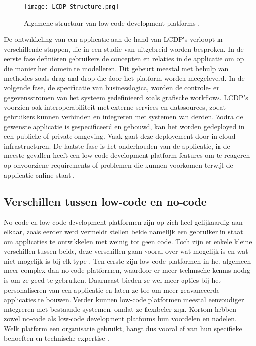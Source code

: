 \begin{figure}[h]
    \centering
    \texttt{[image: LCDP\_Structure.png]}
    \caption[Structuur low-code platforms]{Algemene structuur van low-code development platforms \autocite{Sahay2020}.}
    \label{fig:lcdp_structure}
\end{figure}

De ontwikkeling van een applicatie aan de hand van LCDP's verloopt in verschillende stappen, die in een studie van \textcite{Ruscio2022} uitgebreid worden besproken. In de eerste fase definiëren gebruikers de concepten en relaties in de applicatie om op die manier het domein te modelleren. Dit gebeurt meestal met behulp van methodes zoals drag-and-drop die door het platform worden meegeleverd. In de volgende fase, de specificatie van businesslogica, worden de controle- en gegevensstromen van het systeem gedefinieerd zoals grafische workflows. LCDP's voorzien ook interoperabiliteit met externe services en datasources, zodat gebruikers kunnen verbinden en integreren met systemen van derden. Zodra de gewenste applicatie is gespecificeerd en gebouwd, kan het worden gedeployed in een publieke of private omgeving. Vaak gaat deze deployement door in cloud-infrastructuren. De laatste fase is het onderhouden van de applicatie, in de meeste gevallen heeft een low-code development platform features om te reageren op onvoorziene requirements of problemen die kunnen voorkomen terwijl de applicatie online staat . \\

\subsection{Verschillen tussen low-code en no-code}
\label{subsec:verschillen_low_code}

No-code en low-code development platformen zijn op zich heel gelijkaardig aan elkaar, zoals eerder werd vermeldt stellen beide namelijk een gebruiker in staat om applicaties te ontwikkelen met weinig tot geen code. Toch zijn er enkele kleine verschillen tussen beide, deze verschillen gaan vooral over wat mogelijk is en wat niet mogelijk is bij elk type \autocite{Yan2021}. Ten eerste zijn low-code platformen in het algemeen meer complex dan no-code platformen, waardoor er meer technische kennis nodig is om ze goed te gebruiken. Daarnaast bieden ze wel meer opties bij het personaliseren van een applicatie en laten ze toe om meer geavanceerde applicaties te bouwen. Verder kunnen low-code platformen meestal eenvoudiger integreren met bestaande systemen, omdat ze flexibeler zijn. Kortom hebben zowel no-code als low-code development platforms hun voordelen en nadelen. Welk platform een organisatie gebruikt, hangt dus vooral af van hun specifieke behoeften en technische expertise \autocite{Yan2021}.

